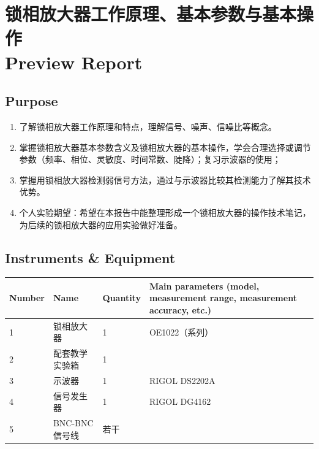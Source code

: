 
\setcounter{section}{0}
\section{锁相放大器工作原理、基本参数与基本操作 \\ Preview Report}


\subsection{Purpose}
\begin{enumerate}
	\item 了解锁相放大器工作原理和特点，理解信号、噪声、信噪比等概念。
	\item 掌握锁相放大器基本参数含义及锁相放大器的基本操作，学会合理选择或调节参数（频率、相位、灵敏度、时间常数、陡降）；复习示波器的使用；
	\item 掌握用锁相放大器检测弱信号方法，通过与示波器比较其检测能力了解其技术优势。
	\item 个人实验期望：希望在本报告中能整理形成一个锁相放大器的操作技术笔记，为后续的锁相放大器的应用实验做好准备。
\end{enumerate}


\subsection{Instruments \& Equipment}
\begin{table}[htbp]
	\centering
	\renewcommand\arraystretch{1.6}
	\begin{tabular}{|p{}|p{}|p{}|p{}|}
		\hline
		Number & Name & Quantity & Main parameters (model, measurement range, measurement accuracy, etc.) \\
		\hline
		1 & 锁相放大器 & 1 & OE1022（系列） \\
		\hline
		2 & 配套教学实验箱 & 1 & \\
		\hline
		3 & 示波器 & 1 & RIGOL DS2202A \\
		\hline
		4 & 信号发生器 & 1 & RIGOL DG4162 \\
		\hline
		5 & BNC-BNC信号线 & 若干 & \\
		\hline
	\end{tabular}
\end{table}


